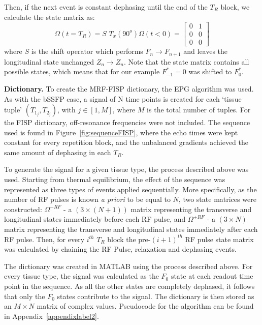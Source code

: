 Then, if the next event is constant dephasing until the end of the $T_R$ block, we calculate the state matrix as:
\begin{equation}
    \Omega (t = T_R) = S \, \, T_x(90^o) \Omega (t < 0) = 
    \begin{bmatrix} 
        0 & 1\\
        0 & 0\\
        0 & 0
    \end{bmatrix}
\end{equation}
where $S$ is the shift operator which performs $F_n \rightarrow F_{n+1}$ and leaves the longitudinal state unchanged $Z_n \rightarrow Z_n$. 
Note that the state matrix contains all possible states, which means that for our example $F_{-1}^* = 0$ was shifted to $F_0^*$.

\hfill

\textbf{Dictionary.} To create the MRF-FISP dictionary, the EPG algorithm was used.
As with the bSSFP case, a signal of N time points is created for each `tissue tuple'
$(T_{1_j}, T_{2_j})$, with $j \in [1, M]$, where $M$ is the total number of tuples.
For the FISP dictionary, off-resonance frequencies were not included.
The sequence used is found in Figure~\ref{fig:sequenceFISP}, where the echo times were kept constant for every repetition block, and the unbalanced gradients achieved the same amount of dephasing in each $T_R$.

\hfill

To generate the signal for a given tissue type, the process described above was used.
Starting from thermal equilibrium, the effect of the sequence was represented as three types of events applied sequentially.
More specifically, as the number of RF pulses is known \textit{a priori} to be equal to $N$, two state matrices were constructed: $\Omega^{-RF}$ - a $(3 \times (N+1))$ matrix representing the transverse and longitudinal states immediately before each RF pulse, and $\Omega^{+RF}$ - a $(3 \times N)$ matrix representing the transverse and longitudinal states immediately after each RF pulse.
Then, for every $i^{th}$ $T_R$ block the pre-$(i+1)^{th}$ RF pulse state matrix was calculated by chaining the RF Pulse, relaxation and dephasing events.

\hfill

The dictionary was created in MATLAB using the process described above.
For every tissue type, the signal was calculated as the $F_0$ state at each readout time point in the sequence.
As all the other states are completely dephased, it follows that only the $F_0$ states contribute to the signal.
The dictionary is then stored as an $M \times N$ matrix of complex values.
Pseudocode for the algorithm can be found in Appendix~\ref{appendixlabel2}.

